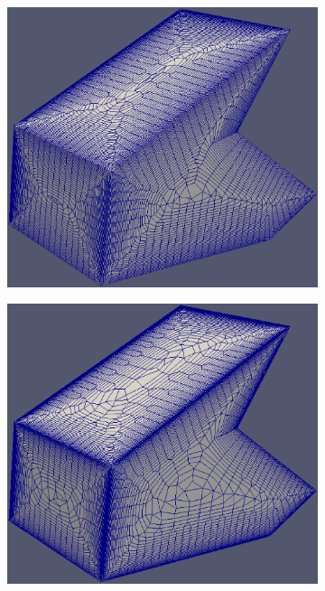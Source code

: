 \begin{figure}
	\centering
	\begin{subfigure}{0.5\textwidth}
		\centering
		\includegraphics[width = 0.95\linewidth]{img/r/variousAngle-x0.5-g1.04/variousAngle.eps}
		\caption{}
		\label{fig-variousAngle-low}
	\end{subfigure}%
	\begin{subfigure}{0.5\textwidth}
		\centering
		\includegraphics[width=0.95\linewidth]{img/r/variousAngle-x0.3-g1.08/variousAngle.eps}

\end{subfigure}
\end{figure}
